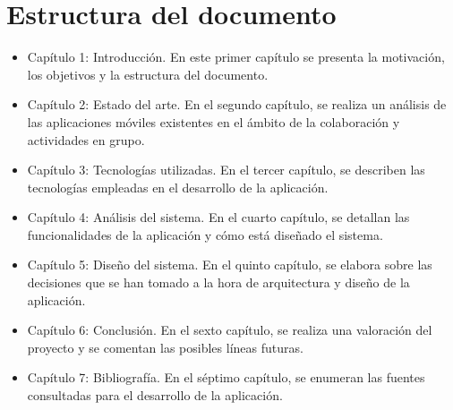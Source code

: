 \section{Estructura del documento}
\begin{itemize}
\item Capítulo 1: Introducción. En este primer capítulo se presenta la 
motivación, los objetivos y la estructura del documento.
\item Capítulo 2: Estado del arte. En el segundo capítulo, se 
realiza un análisis de las aplicaciones móviles existentes en el 
ámbito de la colaboración y actividades en grupo.
\item Capítulo 3: Tecnologías utilizadas. En el tercer capítulo, 
se describen las tecnologías empleadas en el desarrollo de la aplicación.
\item Capítulo 4: Análisis del sistema. En el cuarto capítulo, 
se detallan las funcionalidades de la aplicación y cómo 
está diseñado el sistema.
\item Capítulo 5: Diseño del sistema. En el quinto capítulo, se elabora sobre las decisiones que se han tomado a la hora de arquitectura y diseño de la aplicación.
\item Capítulo 6: Conclusión. En el sexto capítulo, se realiza 
una valoración del proyecto y se comentan las posibles líneas futuras.
\item Capítulo 7: Bibliografía. En el séptimo capítulo, se enumeran 
las fuentes consultadas para el desarrollo de la aplicación. 

\end{itemize}